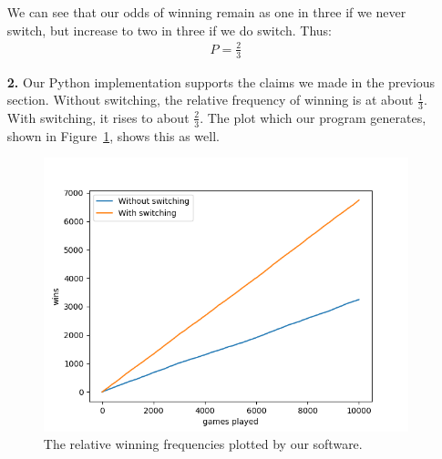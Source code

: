 \documentclass[a4paper,11pt]{article}
\begin{document}
\begin{enumerate}
			We can see that our odds of winning remain as one in three
			if we never switch, but increase to two in three if we do
			switch. Thus:
			\begin{align*}
				P = \frac{2}{3}
			\end{align*}
		\item[\textbf{2.}]
			Our Python implementation supports the claims we made in the previous
			section. Without switching, the relative frequency of winning is
			at about $\frac{1}{3}$. With switching, it rises to about $\frac{2}{3}$.
			The plot which our program generates, shown in Figure~\ref{python_plot},
			shows this as well.
			\begin{figure}
				\includegraphics[scale=0.8]{relative_frequency_of_winning.png}
				\caption{The relative winning frequencies plotted by our software.}
				\label{python_plot}
			\end{figure}
	\end{enumerate}
\end{document}

